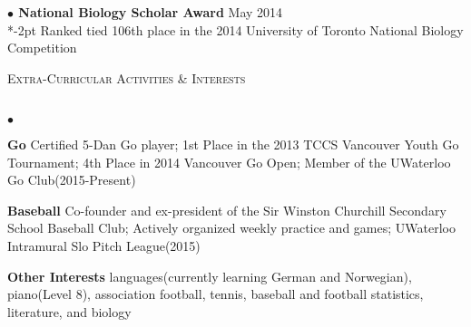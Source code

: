 \documentclass{article}
\newcommand{\lineunder}{\vspace*{-8pt} \\ \hspace*{-18pt} \hrulefill \\}
\newcommand{\header}[1]{{\hspace*{-15pt}\vspace*{6pt} \textsc{#1}} \vspace*{-6pt} \lineunder}
\newenvironment{achievements}{\begin{list}{$\bullet$}{\topsep 0pt \itemsep -2pt}}{\vspace*{4pt}\end{list}}
\newcommand{\award}[3]{\textbf{$\bullet$ \hspace{2bp}#1} \hfill{#2} \\ \vspace{2pt}
}
\begin{document}
\award{National Biology Scholar Award}{May 2014}

\vspace*{-2pt}
\hspace{8bp}
Ranked tied 106th place in the 2014 University of Toronto National Biology Competition

\vspace*{5pt}

\header{Extra-Curricular Activities \& Interests}
\begin{achievements}
\item \textbf{Go} \hspace{3bp}Certified 5-Dan Go player; 1st Place in the 2013 TCCS Vancouver Youth Go Tournament; 4th Place in 2014 Vancouver Go Open; Member of the UWaterloo Go Club(2015-Present)
\item \textbf{Baseball}	\hspace{3bp}Co-founder and ex-president of the Sir Winston Churchill Secondary School Baseball Club; Actively organized weekly practice and games; UWaterloo Intramural Slo Pitch League(2015)
\item \textbf{Other Interests} \hspace{3bp}languages(currently learning German and Norwegian), piano(Level 8), association football, tennis, baseball and football statistics, literature, and biology
\end{achievements}
\end{document}
